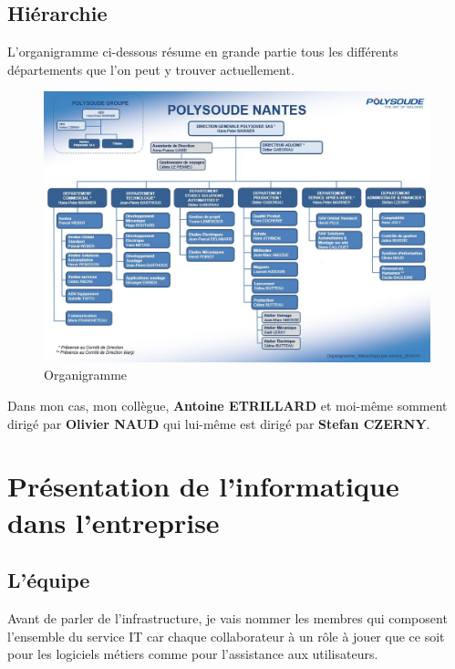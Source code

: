\documentclass[11pt,a4paper,twoside]{article}
\begin{document}
\subsection{Hiérarchie}
L'organigramme ci-dessous résume en grande partie tous les différents départements que l'on peut y trouver actuellement.
\begin{figure}[h!]
  \centering
  \includegraphics[width=\linewidth]{Ressources/Organigramme.jpg}
  \caption{Organigramme}
\end{figure}

Dans mon cas, mon collègue, \textbf{Antoine ETRILLARD} et moi-même somment dirigé par \textbf{Olivier NAUD} qui lui-même est dirigé par \textbf{Stefan CZERNY}.
\newpage

\section{Présentation de l'informatique dans l'entreprise}
\subsection{L'équipe}
Avant de parler de l'infrastructure, je vais nommer les membres qui composent l'ensemble du service IT car chaque collaborateur à un rôle à jouer que ce soit pour les logiciels métiers comme pour l'assistance aux utilisateurs.
\end{document}
